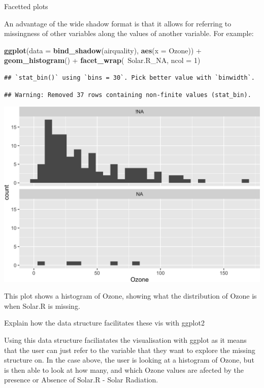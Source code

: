 \documentclass[]{article}
\newenvironment{Shaded}{\begin{snugshade}}{\end{snugshade}}
\newcommand{\KeywordTok}[1]{\textcolor[rgb]{0.13,0.29,0.53}{\textbf{{#1}}}}
\newcommand{\DataTypeTok}[1]{\textcolor[rgb]{0.13,0.29,0.53}{{#1}}}
\newcommand{\DecValTok}[1]{\textcolor[rgb]{0.00,0.00,0.81}{{#1}}}
\newcommand{\StringTok}[1]{\textcolor[rgb]{0.31,0.60,0.02}{{#1}}}
\newcommand{\NormalTok}[1]{{#1}}
\begin{document}
Facetted plots

An advantage of the wide shadow format is that it allows for referring
to missingness of other variables along the values of another variable.
For example:

\begin{Shaded}
\begin{Highlighting}[]
\KeywordTok{ggplot}\NormalTok{(}\DataTypeTok{data =} \KeywordTok{bind_shadow}\NormalTok{(airquality),}
       \KeywordTok{aes}\NormalTok{(}\DataTypeTok{x =} \NormalTok{Ozone)) +}\StringTok{ }
\StringTok{  }\KeywordTok{geom_histogram}\NormalTok{() +}\StringTok{ }
\StringTok{  }\KeywordTok{facet_wrap}\NormalTok{(~Solar.R_NA,}
             \DataTypeTok{ncol =} \DecValTok{1}\NormalTok{)}
\end{Highlighting}
\end{Shaded}

\begin{verbatim}
## `stat_bin()` using `bins = 30`. Pick better value with `binwidth`.
\end{verbatim}

\begin{verbatim}
## Warning: Removed 37 rows containing non-finite values (stat_bin).
\end{verbatim}

\includegraphics{jsm2017_files/figure-latex/unnamed-chunk-2-1.png}

This plot shows a histogram of Ozone, showing what the distribution of
Ozone is when Solar.R is missing.

Explain how the data structure facilitates these vis with ggplot2

Using this data structure faciliatates the visualisation with ggplot as
it means that the user can just refer to the variable that they want to
explore the missing structure on. In the case above, the user is looking
at a histogram of Ozone, but is then able to look at how many, and which
Ozone values are afected by the presence or Absence of Solar.R - Solar
Radiation.
\end{document}
